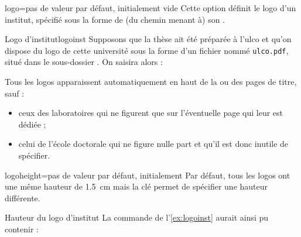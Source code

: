 \begin{docKey}{logo}{=}{pas de valeur
    par défaut, initialement vide}
  Cette option définit le logo d'un institut, spécifié sous la forme de (du
  chemin menant à) son .
  \begin{dbexample}{Logo d'institut}{logoinst}
    Supposons que la thèse ait été préparée à l'\gls{ulco} et qu'on dispose du
    logo de cette université sous la forme d'un fichier nommé
    \texttt{ulco.pdf}, situé dans le sous-dossier . On
    saisira alors :
\begin{bodycode}
\end{bodycode}
\end{dbexample}
Tous les logos apparaissent automatiquement en haut de la ou des
pages de titre, sauf :
\begin{itemize}
\item ceux des laboratoires qui ne figurent que sur l'éventuelle page qui leur
  est dédiée ;
\item celui de l'école doctorale qui ne figure nulle part et qu'il est donc
  inutile de spécifier.
\end{itemize}
\end{docKey}
%
\begin{docKey}{logoheight}{=}{pas de valeur par
    défaut, initialement \docValue*{1.5cm}}
  Par défaut, tous les logos ont une même hauteur de \SI{1.5}{\cm}
  mais la clé  permet de spécifier une hauteur
  différente.
  \begin{dbexample}{Hauteur du logo d'institut}{}
    La commande de l'{\NoAutoSpacing\vref{ex:logoinst}} aurait ainsi pu contenir :
\begin{bodycode}
\end{bodycode}
\end{dbexample}
\end{docKey}
%
%
